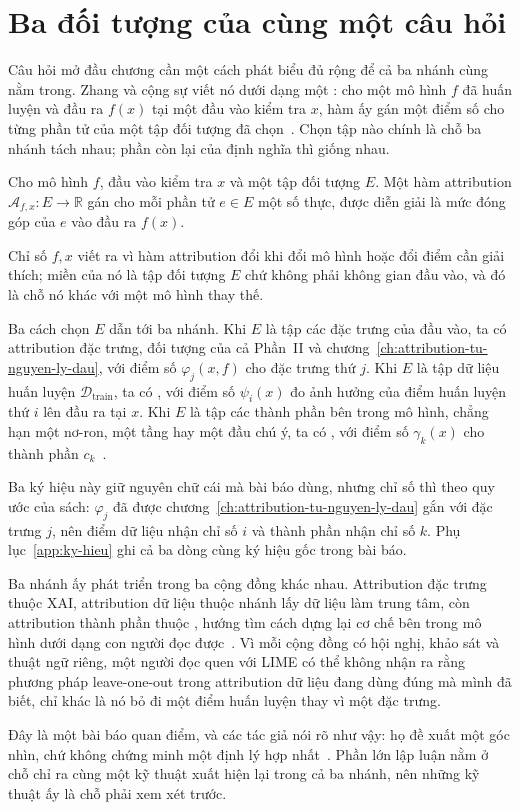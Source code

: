 \section{Ba đối tượng của cùng một câu hỏi}
\label{sec:ch07-ba-doi-tuong}

%
%
Câu hỏi mở đầu chương cần một cách phát biểu đủ rộng để cả ba nhánh cùng nằm
trong. Zhang và cộng sự viết nó dưới dạng một :
cho một mô hình $f$ đã huấn luyện và đầu ra $f(x)$ tại một đầu vào kiểm tra $x$,
hàm ấy gán một điểm số cho từng phần tử của một tập đối tượng đã
chọn~\autocite{p18unified}. Chọn tập nào chính là chỗ ba nhánh tách nhau; phần
còn lại của định nghĩa thì giống nhau.

\begin{definition}
\label{def:ch07-ham-attribution}
Cho mô hình $f$, đầu vào kiểm tra $x$ và một tập đối tượng $E$. Một hàm
attribution $\mathcal{A}_{f,x} : E \to \mathbb{R}$ gán cho mỗi phần tử
$e \in E$ một số thực, được diễn giải là mức đóng góp của $e$ vào đầu ra
$f(x)$.
\end{definition}

Chỉ số $f,x$ viết ra vì hàm attribution đổi khi đổi mô hình hoặc đổi điểm cần
giải thích; miền của nó là tập đối tượng $E$ chứ không phải không gian đầu vào,
và đó là chỗ nó khác với một mô hình thay thế.

Ba cách chọn $E$ dẫn tới ba nhánh. Khi $E$ là tập các đặc trưng của đầu vào, ta
có attribution đặc trưng, đối tượng của cả Phần~II và
chương~\ref{ch:attribution-tu-nguyen-ly-dau}, với điểm số $\varphi_j(x,f)$ cho
đặc trưng thứ $j$. Khi $E$ là tập dữ liệu huấn luyện
$\mathcal{D}_{\mathrm{train}}$, ta có ,
với điểm số $\psi_i(x)$ đo ảnh hưởng của điểm huấn luyện thứ $i$ lên đầu ra tại
$x$. Khi $E$ là tập các thành phần bên trong mô hình, chẳng hạn một nơ-ron, một
tầng hay một đầu chú ý, ta có ,
với điểm số $\gamma_k(x)$ cho thành phần $c_k$~\autocite{p18unified}.

Ba ký hiệu này giữ nguyên chữ cái mà bài báo dùng, nhưng chỉ số thì theo quy ước
của sách: $\varphi_j$ đã được chương~\ref{ch:attribution-tu-nguyen-ly-dau} gắn
với đặc trưng $j$, nên điểm dữ liệu nhận chỉ số $i$ và thành phần nhận chỉ số
$k$. Phụ lục~\ref{app:ky-hieu} ghi cả ba dòng cùng ký hiệu gốc trong bài báo.

Ba nhánh ấy phát triển trong ba cộng đồng khác nhau. Attribution đặc trưng thuộc
XAI, attribution dữ liệu thuộc nhánh lấy dữ liệu làm trung tâm, còn attribution
thành phần thuộc , hướng tìm
cách dựng lại cơ chế bên trong mô hình dưới dạng con người đọc
được~\autocite{p18unified}. Vì mỗi cộng đồng có hội nghị, khảo sát và thuật ngữ
riêng, một người đọc quen với LIME có thể không nhận ra rằng phương pháp
leave-one-out trong attribution dữ liệu đang dùng đúng 
mà mình đã biết, chỉ khác là nó bỏ đi một điểm huấn luyện thay vì một đặc trưng.

Đây là một bài báo quan điểm, và các tác giả nói rõ như vậy: họ đề xuất một góc
nhìn, chứ không chứng minh một định lý hợp nhất~\autocite{p18unified}. Phần lớn
lập luận nằm ở chỗ chỉ ra cùng một kỹ thuật xuất hiện lại trong cả ba nhánh, nên
những kỹ thuật ấy là chỗ phải xem xét trước.
